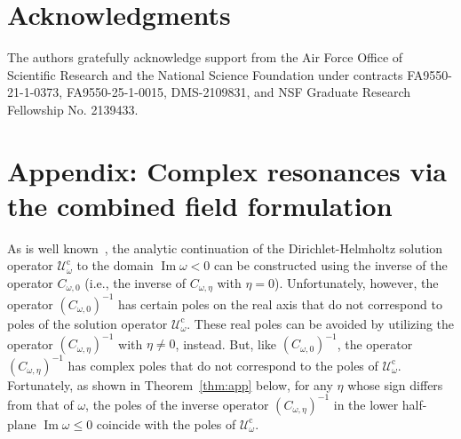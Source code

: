 \documentclass[11pt]{article}
\theoremstyle{plain}
\theoremstyle{remark}
\renewcommand{\Im}{\operatorname{Im}}
\begin{document}
\section*{Acknowledgments}
The authors gratefully acknowledge support from the Air Force Office
of Scientific Research and the National Science Foundation under
contracts FA9550-21-1-0373, FA9550-25-1-0015, DMS-2109831, and NSF
Graduate Research Fellowship No. 2139433.




\appendix
\section{Appendix: Complex resonances via the combined field
  formulation }\label{app:combined_form}

As is well known~\cite{taylorbook}, the analytic continuation of the
Dirichlet-Helmholtz solution operator $\mathcal{U}^\mathrm{c}_\omega$ to the
domain $\Im\omega < 0$ can be constructed using the inverse of the
operator $C_{\omega,0}$ (i.e., the inverse of $C_{\omega,\eta}$ with
$\eta = 0$). Unfortunately, however, the operator
$(C_{\omega,0})^{-1}$ has certain poles on the real axis that do not
correspond to poles of the solution operator
$\mathcal{U}^\mathrm{c}_\omega$.  These real poles can be avoided by
utilizing the operator $(C_{\omega,\eta})^{-1}$ with $\eta\ne 0$,
instead. But, like $(C_{\omega,0})^{-1}$, the operator
$(C_{\omega,\eta})^{-1}$ has complex poles that do not correspond to
the poles of $\mathcal{U}^\mathrm{c}_\omega$. Fortunately, as shown in
Theorem~\ref{thm:app} below, for any $\eta$ whose sign differs from
that of $\omega$, the poles of the inverse operator
$(C_{\omega,\eta})^{-1}$ in the lower half-plane $\Im\omega \leq 0$
coincide with the poles of $\mathcal{U}^\mathrm{c}_\omega$.
\end{document}
